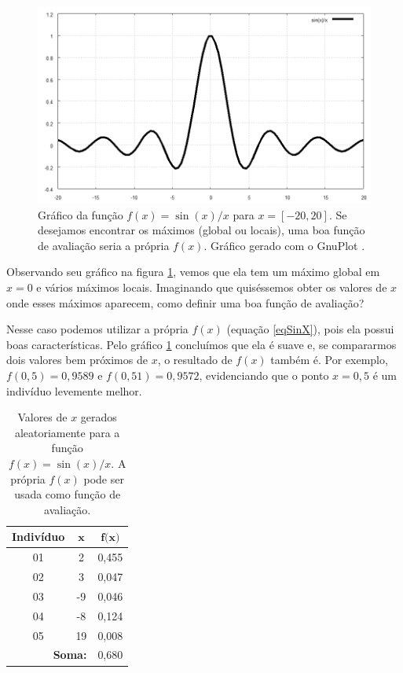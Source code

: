 	\begin{figure}[htp]
		\begin{center}
			\includegraphics[width=13cm]{figs/ga/sen_x__x.png}
		\end{center}
		\caption{\label{figSen}Gráfico da função $f(x) = \sin(x) / x$ para $x = [-20,20]$. Se desejamos encontrar os máximos (global ou locais), uma boa função de avaliação seria a própria $f(x)$. Gráfico gerado com o GnuPlot \cite{gnuplot}.}
	\end{figure}
	
	Observando seu gráfico na figura \ref{figSen}, vemos que ela tem um máximo global em $x = 0$ e vários máximos locais. Imaginando que quiséssemos obter os valores de $x$ onde esses máximos aparecem, como definir uma boa função de avaliação?
	
	Nesse caso podemos utilizar a própria $f(x)$ (equação \ref{eqSinX}), pois ela possui boas características. Pelo gráfico \ref{figSen} concluímos que ela é suave e, se compararmos dois valores bem próximos de $x$, o resultado de $f(x)$ também é. Por exemplo, $f(0,5) = 0,9589$ e $f(0,51) = 0,9572$, evidenciando que o ponto $x = 0,5$ é um indivíduo levemente melhor.
	
	
	\begin{table}[htp]		
		\caption{\label{tabSen}Valores de $x$ gerados aleatoriamente para a função $f(x) = \sin(x)/x$. A própria $f(x)$ pode ser usada como função de avaliação.}
		\begin{center}
			\begin{tabular}{c|c|c}
				\hline
				\textbf{Indivíduo}& $\textbf{x}$		& $\textbf{f(x)}$ \\
				\hline
				01 & 	2							& 0,455 \\
				02 & 	3							& 0,047 \\
				03 &	-9						& 0,046\\	
				04 &	-8							& 0,124 \\
				05 &	19							& 	0,008 \\
				\hline
				\multicolumn{2}{r}{\textbf{Soma:}} & 0,680 \\
				\hline
			\end{tabular}
		\end{center}
	\end{table}
	

